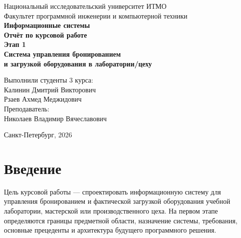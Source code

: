 \documentclass[12pt,a4paper]{article}
\begin{document}
\hypersetup{pageanchor=false}

\begin{titlepage}
\begin{center}
    \large
    Национальный исследовательский университет ИТМО\\
    Факультет программной инженерии и компьютерной техники\\
    \vspace{2.5cm}
    \textbf{\Large Информационные системы}\\
    \vspace{0.5cm}
    \textbf{\Large Отчёт по курсовой работе}\\
    \vspace{0.35cm}
    \textbf{\large Этап 1}\\
    \vspace{0.8cm}
    \textbf{\Large Система управления бронированием\\
    и загрузкой оборудования в лаборатории/цеху}\\
    \vspace{2.4cm}
    \begin{flushright}
        Выполнили студенты 3 курса:\\
        Калинин Дмитрий Викторович\\
        Рзаев Ахмед Меджидович\\
        \vspace{0.6cm}
        Преподаватель:\\
        Николаев Владимир Вячеславович
    \end{flushright}
    \vfill
    Санкт-Петербург, 2026
\end{center}
\end{titlepage}

\clearpage
\hypersetup{pageanchor=true}
\begin{singlespace}
\tableofcontents
\end{singlespace}
\newpage
{}

\section{Введение}

Цель курсовой работы --- спроектировать информационную систему для управления
бронированием и фактической загрузкой оборудования учебной лаборатории,
мастерской или производственного цеха. На первом этапе определяются границы
предметной области, назначение системы, требования, основные прецеденты и
архитектура будущего программного решения.
\end{document}
